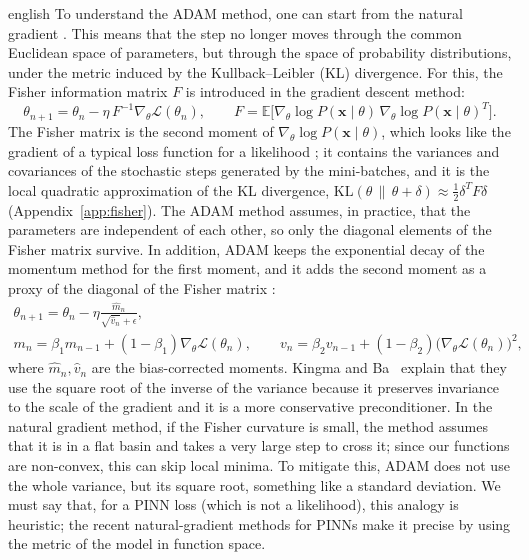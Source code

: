 \documentclass[12pt,letterpaper,twoside]{book}
\newcommand{\Loss}{\mathcal{L}}
\begin{document}
\begin{hyphenrules}{english}
To understand the ADAM method, one can start from the natural gradient
\cite{amari1998,pascanu2013}. This means that the step no longer moves through the common Euclidean
space of parameters, but through the space of probability distributions, under the metric induced by
the Kullback--Leibler (KL) divergence. For this, the Fisher information matrix $F$ is introduced in the
gradient descent method:
\begin{equation}
  \theta_{n+1}=\theta_n-\eta\,F^{-1}\nabla_\theta\Loss(\theta_n),\qquad
  F=\mathbb{E}\big[\nabla_\theta\log P(\mathbf{x}\mid\theta)\,\nabla_\theta\log P(\mathbf{x}\mid\theta)^{T}\big].
  \label{eq:natural-gradient}
\end{equation}
The Fisher matrix is the second moment of $\nabla_\theta\log P(\mathbf{x}\mid\theta)$, which looks like the
gradient of a typical loss function for a likelihood \cite{amari1998}; it contains the variances and
covariances of the stochastic steps generated by the mini-batches, and it is the local quadratic
approximation of the KL divergence, $\mathrm{KL}(\theta\,\|\,\theta+\delta)\approx\frac12\delta^{T}F\delta$
(Appendix~\ref{app:fisher}). The ADAM method assumes, in practice, that the parameters are independent of each
other, so only the diagonal elements of the Fisher matrix survive. In addition, ADAM keeps the exponential
decay of the momentum method \cite{ruder2016} for the first moment, and it adds the second moment as
a proxy of the diagonal of the Fisher matrix \cite{kingma2015}:
\begin{equation}
  \begin{gathered}
  \theta_{n+1}=\theta_n-\eta\frac{\hat m_n}{\sqrt{\hat v_n}+\epsilon},\\
  m_n=\beta_1m_{n-1}+(1-\beta_1)\nabla_\theta\Loss(\theta_n),\qquad
  v_n=\beta_2v_{n-1}+(1-\beta_2)\big(\nabla_\theta\Loss(\theta_n)\big)^2,
  \end{gathered}
  \label{eq:adam}
\end{equation}
where $\hat m_n,\hat v_n$ are the bias-corrected moments. Kingma and Ba~\cite{kingma2015} explain that they use the
square root of the inverse of the variance because it preserves invariance to the scale of the gradient
and it is a more conservative preconditioner. In the natural gradient method, if the Fisher curvature is
small, the method assumes that it is in a flat basin and takes a very large step to cross it; since our
functions are non-convex, this can skip local minima. To mitigate this, ADAM does not use the whole
variance, but its square root, something like a standard deviation. We must say that, for a PINN loss
(which is not a likelihood), this analogy is heuristic; the recent natural-gradient methods for PINNs
\cite{schwencke2025anagram,schwencke2025thesis} make it precise by using the metric of the model in
function space.


\end{hyphenrules}
\end{document}
